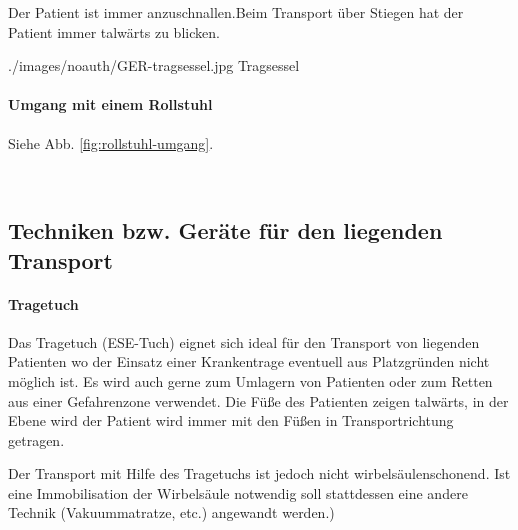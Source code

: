 {
Der Patient ist immer anzuschnallen.Beim Transport über
Stiegen hat der Patient immer talwärts zu blicken.
}{

}
{./images/noauth/GER-tragsessel.jpg}
{Tragsessel}
{}


\paragraph{Umgang mit einem Rollstuhl}

Siehe Abb. \ref{fig:rollstuhl-umgang}.

~

\subsection{Techniken bzw. Geräte für den liegenden Transport}

\paragraph{Tragetuch}

Das Tragetuch (ESE-Tuch) eignet sich ideal für den Transport
von liegenden Patienten wo der Einsatz einer Krankentrage
eventuell aus Platzgründen nicht möglich ist. Es wird auch
gerne zum Umlagern von Patienten oder zum Retten aus einer
Gefahrenzone verwendet. Die Füße des Patienten zeigen
talwärts, in der Ebene wird der Patient wird immer mit den
Füßen in Transportrichtung getragen.

Der Transport mit Hilfe des Tragetuchs ist jedoch nicht
wirbelsäulenschonend. Ist eine Immobilisation der
Wirbelsäule notwendig soll stattdessen eine andere Technik
(Vakuummatratze, etc.) angewandt werden.)

